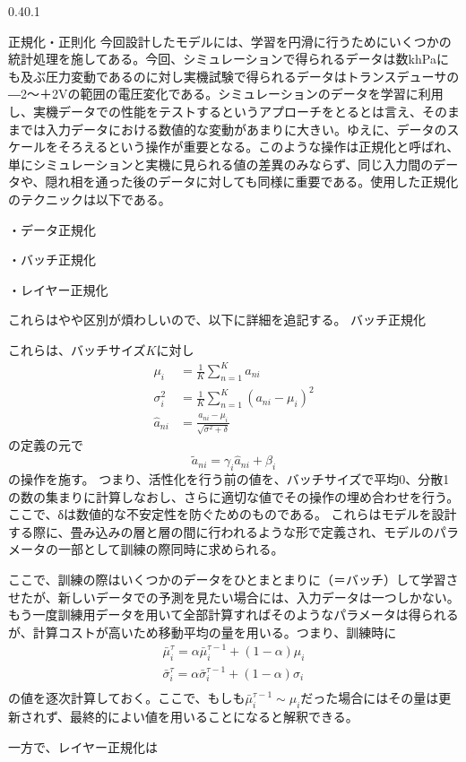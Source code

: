 \documentclass[uplatex]{suribt}
\makeatletter
\renewcommand{\subsection}{%
    \@startsection{subsection}{1}{\z@}%
    {0.4\Cvs}{0.1\Cvs}%
    {\normalfont\normalsize\headfont\raggedright}}
\makeatother
\begin{document}
\subsection{正規化・正則化}
今回設計したモデルには、学習を円滑に行うためにいくつかの統計処理を施してある。今回、シミュレーションで得られるデータは数khPaにも及ぶ圧力変動であるのに対し実機試験で得られるデータはトランスデューサの―2～＋2Vの範囲の電圧変化である。シミュレーションのデータを学習に利用し、実機データでの性能をテストするというアプローチをとるとは言え、そのままでは入力データにおける数値的な変動があまりに大きい。ゆえに、データのスケールをそろえるという操作が重要となる。このような操作は正規化と呼ばれ、単にシミュレーションと実機に見られる値の差異のみならず、同じ入力間のデータや、隠れ相を通った後のデータに対しても同様に重要である。使用した正規化のテクニックは以下である。\par
・データ正規化\par
・バッチ正規化\par
・レイヤー正規化\par
これらはやや区別が煩わしいので、以下に詳細を追記する。
バッチ正規化\par
これらは、バッチサイズ$K$に対し
\begin{align}
    \mu_i& =\frac{1}{K}\sum_{n=1}^{K}a_{ni}\\
    \sigma_i^2& =\frac{1}{K}\sum_{n=1}^{K}(a_{ni}-\mu_i)^2\\
    \hat{a}_{ni}&=\frac{a_{ni}-\mu_i}{\sqrt{\sigma^2+\delta}}
\end{align}
の定義の元で
\begin{equation}
    \tilde a_{ni} = \gamma_i \hat{a}_{ni}+\beta_i
\end{equation}
の操作を施す。
つまり、活性化を行う前の値を、バッチサイズで平均0、分散1の数の集まりに計算しなおし、さらに適切な値でその操作の埋め合わせを行う。ここで、δは数値的な不安定性を防ぐためのものである。
これらはモデルを設計する際に、畳み込みの層と層の間に行われるような形で定義され、モデルのパラメータの一部として訓練の際同時に求められる。\par
ここで、訓練の際はいくつかのデータをひとまとまりに（＝バッチ）して学習させたが、新しいデータでの予測を見たい場合には、入力データは一つしかない。もう一度訓練用データを用いて全部計算すればそのようなパラメータは得られるが、計算コストが高いため移動平均の量を用いる。つまり、訓練時に
\begin{align}
    \bar \mu_i^{\tau} = \alpha \bar \mu_i^{\tau-1}+(1-\alpha)\mu_i\\
    \bar \sigma_i^{\tau} = \alpha \bar \sigma_i^{\tau-1}+(1-\alpha)\sigma_i\\
\end{align}
の値を逐次計算しておく。ここで、もしも$ \bar \mu_i^{\tau-1} \sim \mu_i$だった場合にはその量は更新されず、最終的によい値を用いることになると解釈できる。\par
一方で、レイヤー正規化は
\end{document}
